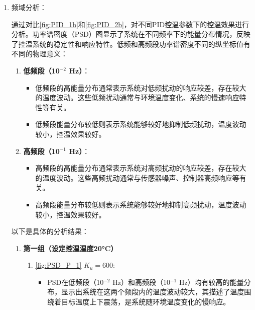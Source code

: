 \documentclass[dvipsnames, svgnames,a4paper,11pt]{article}
\begin{document}
\begin{enumerate}
\begin{enumerate}
            \end{enumerate}

        \item 频域分析：
        
            通过对比\cref{fig:PID_1b}和\cref{fig:PID_2b}，对不同PID控温参数下的控温效果进行分析。功率谱密度（PSD）图显示了系统在不同频率下的能量分布情况，反映了控温系统的稳定性和响应特性。低频和高频段功率谱密度不同的纵坐标值有不同的物理意义：

            \begin{enumerate}
                \item \textbf{低频段（10$^{-2}$ Hz）}：
                \begin{itemize}
                    \item 低频段的高能量分布通常表示系统对低频扰动的响应较差，存在较大的温度波动。这些低频扰动通常与环境温度变化、系统的慢速响应特性等有关。
                    \item 低频段能量分布较低则表示系统能够较好地抑制低频扰动，温度波动较小，控温效果较好。
                \end{itemize}
            
                \item \textbf{高频段（10$^{-1}$ Hz）}：
                \begin{itemize}
                    \item 高频段的高能量分布通常表示系统对高频扰动的响应较差，存在较大的温度波动。这些高频扰动通常与传感器噪声、控制器高频响应等有关。
                    \item 高频段能量分布较低则表示系统能够较好地抑制高频扰动，温度波动较小，控温效果较好。
                \end{itemize}
            \end{enumerate}
        
            以下是具体的分析结果：
        
        \begin{enumerate}
            \item \textbf{第一组（设定控温温度20°C）}
            \begin{enumerate}
                \item \cref{fig:PSD_P_1} \( K_u = 600 \):
                \begin{itemize}
                    \item PSD在低频段（10$^{-2}$ Hz）和高频段（10$^{-1}$ Hz）均有较高的能量分布，显示出系统在这两个频段内的温度波动较大，其描述了温度围绕着目标温度上下震荡，是系统随环境温度变化的慢响应。
                \end{itemize}
                

\end{enumerate}
\end{enumerate}
\end{enumerate}
\end{document}
